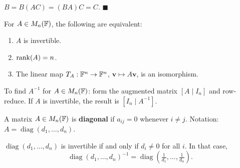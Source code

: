 \begin{proofbox}
$B = B(AC) = (BA)C = C$. \hfill$\blacksquare$
\end{proofbox}

\begin{thmbox}
For $A\in M_{n}(\mathbb{F})$, the following are equivalent:
\begin{enumerate}
    \item $A$ is invertible.
    \item $\operatorname{rank}(A) = n$.
    \item The linear map $T_A:\mathbb{F}^n\to\mathbb{F}^n$, $\mathbf{v}\mapsto A\mathbf{v}$,
          is an isomorphism.
\end{enumerate}
\end{thmbox}

\begin{methodbox}
To find $A^{-1}$ for $A\in M_{n}(\mathbb{F})$: form the augmented matrix $[A\mid I_n]$
and row-reduce.  If $A$ is invertible, the result is $[I_n\mid A^{-1}]$.
\end{methodbox}

\begin{defbox}
A matrix $A\in M_{n}(\mathbb{F})$ is \textbf{diagonal} if $a_{ij}=0$ whenever $i\neq j$.
Notation: $A = \operatorname{diag}(d_1,\ldots,d_n)$.
\end{defbox}

\begin{propbox}
$\operatorname{diag}(d_1,\ldots,d_n)$ is invertible if and only if
$d_i\neq 0$ for all $i$.  In that case,
\[
    \operatorname{diag}(d_1,\ldots,d_n)^{-1}
    = \operatorname{diag}\!\left(\tfrac{1}{d_1},\ldots,\tfrac{1}{d_n}\right).
\]
\end{propbox}
